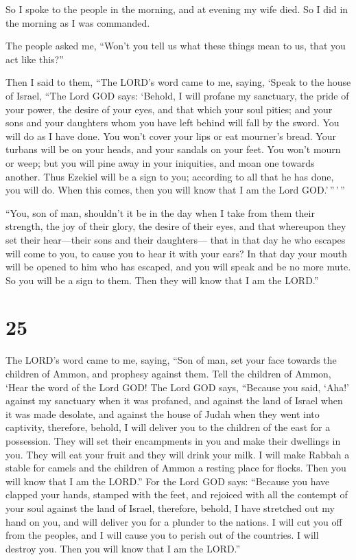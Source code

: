  So I spoke to the people in the morning, and at evening my
wife died. So I did in the morning as I was commanded.

 The people asked me, ``Won't you tell us what these things
mean to us, that you act like this?''

 Then I said to them, ``The LORD's word came to me, saying,
 `Speak to the house of Israel, ``The Lord GOD says:
`Behold, I will profane my sanctuary, the pride of your power, the
desire of your eyes, and that which your soul pities; and your sons and
your daughters whom you have left behind will fall by the sword.
 You will do as I have done. You won't cover your lips or
eat mourner's bread.  Your turbans will be on your heads,
and your sandals on your feet. You won't mourn or weep; but you will
pine away in your iniquities, and moan one towards another.
 Thus Ezekiel will be a sign to you; according to all that
he has done, you will do. When this comes, then you will know that I am
the Lord GOD.'\,''\,'\,''

 ``You, son of man, shouldn't it be in the day when I take
from them their strength, the joy of their glory, the desire of their
eyes, and that whereupon they set their hear---their sons and their
daughters---  that in that day he who escapes will come to
you, to cause you to hear it with your ears?  In that day
your mouth will be opened to him who has escaped, and you will speak and
be no more mute. So you will be a sign to them. Then they will know that
I am the LORD.''

\hypertarget{section-23}{%
\section{25}\label{section-23}}

 The LORD's word came to me, saying,  ``Son of
man, set your face towards the children of Ammon, and prophesy against
them.  Tell the children of Ammon, `Hear the word of the
Lord GOD! The Lord GOD says, ``Because you said, `Aha!' against my
sanctuary when it was profaned, and against the land of Israel when it
was made desolate, and against the house of Judah when they went into
captivity,  therefore, behold, I will deliver you to the
children of the east for a possession. They will set their encampments
in you and make their dwellings in you. They will eat your fruit and
they will drink your milk.  I will make Rabbah a stable for
camels and the children of Ammon a resting place for flocks. Then you
will know that I am the LORD.''  For the Lord GOD says:
``Because you have clapped your hands, stamped with the feet, and
rejoiced with all the contempt of your soul against the land of Israel,
 therefore, behold, I have stretched out my hand on you, and
will deliver you for a plunder to the nations. I will cut you off from
the peoples, and I will cause you to perish out of the countries. I will
destroy you. Then you will know that I am the LORD.''

